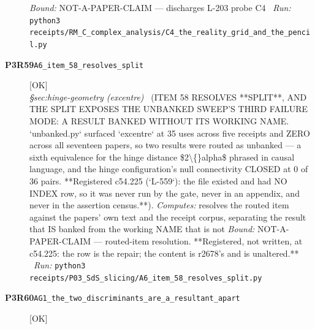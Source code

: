 \begin{description}
 \emph{Bound:} NOT-A-PAPER-CLAIM --- discharges L-203 probe C4
\ \emph{Run:} \texttt{python3 receipts/RM\_C\_complex\_analysis/C4\_the\_reality\_grid\_and\_the\_pencil.py}
\item[\rcptlabel{A6_item_58_resolves_split}{P3R59}\textbf{P3R59}\quad\texttt{A6\_item\_58\_resolves\_split}]\hfill\textsf{[OK]}\\
\textit{\S{}sec:hinge-geometry (excentre)} \ (ITEM 58 RESOLVES **SPLIT**, AND THE SPLIT EXPOSES THE UNBANKED SWEEP'S THIRD FAILURE MODE: A RESULT BANKED WITHOUT ITS WORKING NAME. `unbanked.py` surfaced `excentre` at 35 uses across five receipts and ZERO across all seventeen papers, so two results were routed as unbanked --- a sixth equivalence for the hinge distance \$2\textbackslash\{\}alpha\$ phrased in causal language, and the hinge configuration's null connectivity CLOSED at 0 of 36 pairs. **Registered c54.225 (`L-559`): the file existed and had NO INDEX row, so it was never run by the gate, never in an appendix, and never in the assertion census.**). 
\emph{Computes:} resolves the routed item against the papers' own text and the receipt corpus, separating the result that IS banked from the working NAME that is not
 \emph{Bound:} NOT-A-PAPER-CLAIM --- routed-item resolution. **Registered, not written, at c54.225: the row is the repair; the content is r2678's and is unaltered.**
\ \emph{Run:} \texttt{python3 receipts/P03\_SdS\_slicing/A6\_item\_58\_resolves\_split.py}
\item[\rcptlabel{AG1_the_two_discriminants_are_a_resultant_apart}{P3R60}\textbf{P3R60}\quad\texttt{AG1\_the\_two\_discriminants\_are\_a\_resultant\_apart}]\hfill\textsf{[OK]}\\

\end{description}
